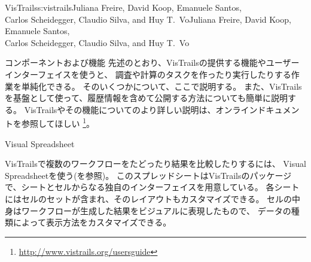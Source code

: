 \begin{aosachaptertoc}{VisTrails}{s:vistrails}{Juliana Freire, David Koop, Emanuele Santos, \\ Carlos Scheidegger, Claudio Silva, and Huy T.\ Vo}{Juliana Freire, David Koop, Emanuele Santos, \\ \hspace*{0.9cm} Carlos Scheidegger, Claudio Silva, and Huy T.\ Vo}
\begin{aosasect1}{コンポーネントおよび機能}
先述のとおり、VisTrailsの提供する機能やユーザーインターフェイスを使うと、
調査や計算のタスクを作ったり実行したりする作業を単純化できる。
そのいくつかについて、ここで説明する。
また、VisTrailsを基盤として使って、履歴情報を含めて公開する方法についても簡単に説明する。
VisTrailsやその機能についてのより詳しい説明は、オンラインドキュメントを参照してほしい
\footnote{\url{http://www.vistrails.org/usersguide}}。


\begin{aosasect2}{Visual Spreadsheet}

VisTrailsで複数のワークフローをたどったり結果を比較したりするには、
Visual Spreadsheetを使う(を参照)。
このスプレッドシートはVisTrailsのパッケージで、シートとセルからなる独自のインターフェイスを用意している。
各シートにはセルのセットが含まれ、そのレイアウトもカスタマイズできる。
セルの中身はワークフローが生成した結果をビジュアルに表現したもので、
データの種類によって表示方法をカスタマイズできる。


\end{aosasect2}
\end{aosasect1}
\end{aosachaptertoc}
